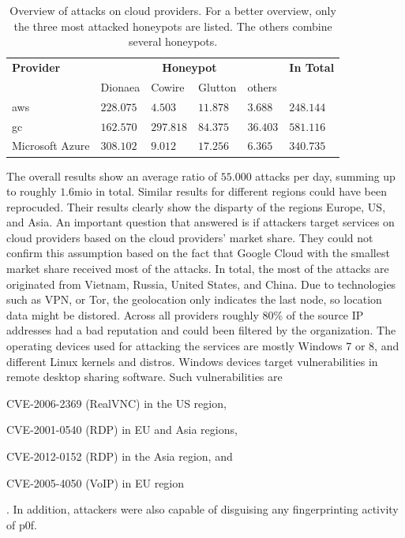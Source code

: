 \begin{table}[ht]
    \centering
    \caption[Overview of attacks on cloud providers]{Overview of attacks on cloud providers. For a better overview, only the three most attacked honeypots are listed. The others combine several honeypots.}
    \begin{tabular}{l|llll|l}
        \toprule
        \textbf{Provider} & \multicolumn{4}{c|}{\textbf{Honeypot}} & \textbf{In Total}                                   \\
                          & Dionaea                                & Cowire            & Glutton  & others   &           \\
        \hline
        \acl{aws}         & $228.075$                              & $4.503$           & $11.878$ & $3.688$  & $248.144$ \\
        \acl{gc}          & $162.570$                              & $297.818$         & $84.375$ & $36.403$ & $581.116$ \\
        Microsoft Azure   & $308.102$                              & $9.012$           & $17.256$ & $6.365$  & $340.735$ \\
        \bottomrule
    \end{tabular}
    \label{tab:overview-cloud-security}
\end{table}

The overall results show an average ratio of $55.000$ attacks per day, summing up to roughly $1.6$mio in total.
Similar results for different regions could have been reprocuded.
Their results clearly show the disparty of the regions Europe, US, and Asia.
An important question that \citet{Kelly2021} answered is if attackers target services on cloud providers based on the cloud providers' market share.
They could not confirm this assumption based on the fact that Google Cloud with the smallest market share received most of the attacks.
In total, the most of the attacks are originated from Vietnam, Russia, United States, and China.
Due to technologies such as VPN, or Tor, the geolocation only indicates the last node, so location data might be distored.
Across all providers roughly $80\%$ of the source IP addresses had a bad reputation and could been filtered by the organization.
The operating devices used for attacking the services are mostly Windows 7 or 8, and different Linux kernels and distros.
Windows devices target vulnerabilities in remote desktop sharing software. Such vulnerabilities are
\begin{enumerate*}[label=(\roman*)]
    \item CVE-2006-2369 (RealVNC) in the US region,
    \item CVE-2001-0540 (RDP) in EU and Asia regions,
    \item CVE-2012-0152 (RDP) in the Asia region, and
    \item CVE-2005-4050 (VoIP) in EU region
\end{enumerate*}.
In addition, attackers were also capable of disguising any fingerprinting activity of p0f.

